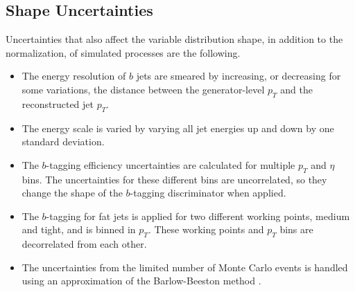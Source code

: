 \subsection{Shape Uncertainties}

Uncertainties that also affect the variable distribution shape,
in addition to the normalization, of simulated processes are the following.
\begin{itemize}
\item The energy resolution of $b$ jets are smeared by increasing,
  or decreasing for some variations,
  the distance between the generator-level $p_T$ and the reconstructed jet $p_T$.
\item The energy scale is varied by varying all jet energies up and down by
  one standard deviation.
\item The $b$-tagging efficiency uncertainties are calculated
  for multiple $p_T$ and $\eta$ bins.
  The uncertainties for these different bins are uncorrelated,
  so they change the shape of the $b$-tagging discriminator when applied. 
\item The $b$-tagging for fat jets is applied for two different working points,
  medium and tight, and is binned in $p_T$.
  These working points and $p_T$ bins are decorrelated from each other.
\item The uncertainties from the limited number of Monte Carlo events is handled
  using an approximation of the Barlow-Beeston method \cite{BARLOW1993219}.
\end{itemize}
